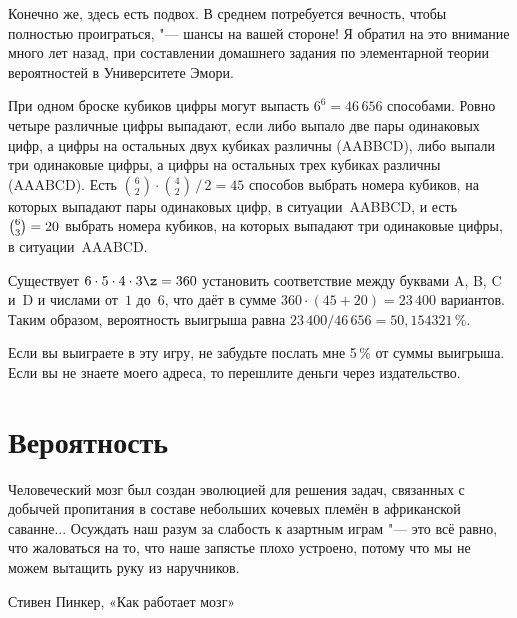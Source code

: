 \documentclass[twoside]{book}
\begin{document}
Конечно же, здесь есть подвох.
В среднем потребуется вечность, чтобы полностью проиграться, "--- шансы на вашей стороне! 
Я обратил на это внимание много лет назад,
при составлении домашнего задания по элементарной теории вероятностей в Университете Эмори.

При одном броске кубиков цифры могут выпасть $6^6 =46\,656$ способами.
Ровно четыре различные цифры выпадают, если либо выпало две пары
одинаковых цифр, а цифры на остальных двух кубиках различны (AABBCD), либо выпали три
одинаковые цифры, а цифры на остальных трех кубиках различны (AAABCD).
Есть
\(\binom62\cdot\binom42\,\big/\,2=45\)
способов выбрать номера кубиков, на которых выпадают пары одинаковых
цифр, в ситуации~AABBCD,  
и есть $\smash[t]{\binom63}=20$ выбрать номера кубиков, на которых
выпадают три одинаковые цифры, в ситуации~AAABCD.

Существует $6\cdot 5\cdot 4\cdot 3\z=360$ установить соответствие
между буквами A, B, C и~D и числами от~$1$ до~$6$, что даёт в сумме $360\cdot (45+20)=23\,400$ вариантов.
Таким образом, вероятность выигрыша равна
$23\,400/46\,656 = 50{,}154321\,\%$.
\heart

\medskip
Если вы выиграете в эту игру, не забудьте послать мне 5\,\% от суммы
выигрыша. Если вы не знаете моего адреса, то перешлите деньги через
издательство.



\chapter{Вероятность}

\thispagestyle{empty}

\setlength{\epigraphwidth}{.75\textwidth}
\epigraph{Человеческий мозг был создан эволюцией для решения задач, связанных с добычей пропитания в составе небольших кочевых племён в африканской саванне...
Осуждать наш разум за слабость к азартным играм "--- это всё равно, что жаловаться на то, что наше запястье плохо устроено, потому что мы не можем вытащить руку из наручников.\vspace{1ex}
}{Стивен Пинкер, «Как работает мозг» %
}
\end{document}
